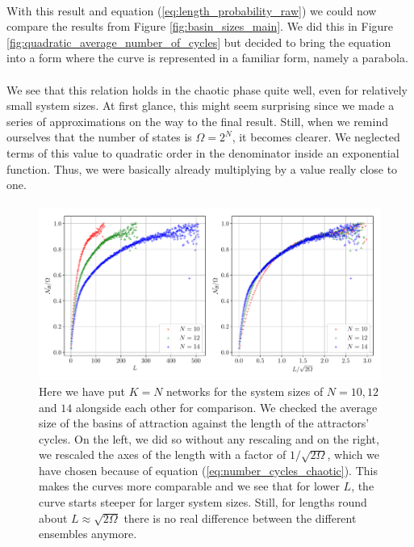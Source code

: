 \paragraph*{}
With this result and equation (\ref{eq:length_probability_raw}) we could now compare the results from Figure \ref{fig:basin_sizes_main}. We did this in Figure \ref{fig:quadratic_average_number_of_cycles} but decided to bring the equation into a form where the curve is represented in a familiar form, namely a parabola. 

\paragraph*{}
We see that this relation holds in the chaotic phase quite well, even for relatively small system sizes. At first glance, this might seem surprising since we made a series of approximations on the way to the final result. Still, when we remind ourselves that the number of states is $\Omega=2^{N}$, it becomes clearer. We neglected terms of this value to quadratic order in the denominator inside an exponential function. Thus, we were basically already multiplying by a value really close to one.

\paragraph*{}
\begin{figure}[t]
	\includegraphics[width=\textwidth]{Plots/N_K_compare}
	\caption{Here we have put $K=N$ networks for the system sizes of $N=10, 12$ and $14$ alongside each other for comparison. We checked the average size of the basins of attraction against the length of the attractors' cycles. On the left, we did so without any rescaling and on the right, we rescaled the axes of the length with a factor of $1/\sqrt{2\Omega}$, which we have chosen because of equation (\ref{eq:number_cycles_chaotic}). This makes the curves more comparable and we see that for lower $L$, the curve starts steeper for larger system sizes. Still, for lengths round about $L\approx \sqrt{2\Omega}$ there is no real difference between the different ensembles anymore.}
	\label{fig:N_K_compare}
\end{figure}

